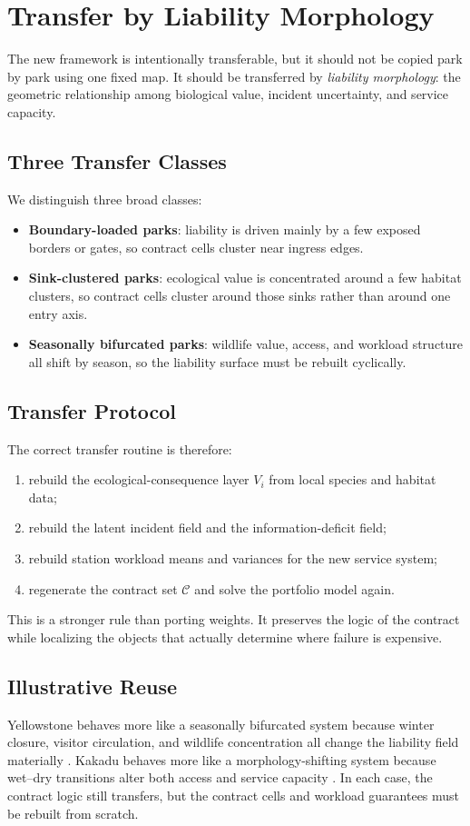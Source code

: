 \section{Transfer by Liability Morphology}
The new framework is intentionally transferable, but it should not be copied park by park using one fixed map. It should be transferred by \emph{liability morphology}: the geometric relationship among biological value, incident uncertainty, and service capacity.

\subsection{Three Transfer Classes}
We distinguish three broad classes:
\begin{itemize}
  \item \textbf{Boundary-loaded parks}: liability is driven mainly by a few exposed borders or gates, so contract cells cluster near ingress edges.
  \item \textbf{Sink-clustered parks}: ecological value is concentrated around a few habitat clusters, so contract cells cluster around those sinks rather than around one entry axis.
  \item \textbf{Seasonally bifurcated parks}: wildlife value, access, and workload structure all shift by season, so the liability surface must be rebuilt cyclically.
\end{itemize}

\subsection{Transfer Protocol}
The correct transfer routine is therefore:
\begin{enumerate}
  \item rebuild the ecological-consequence layer \(V_i\) from local species and habitat data;
  \item rebuild the latent incident field and the information-deficit field;
  \item rebuild station workload means and variances for the new service system;
  \item regenerate the contract set \(\mathcal{C}\) and solve the portfolio model again.
\end{enumerate}
This is a stronger rule than porting weights. It preserves the logic of the contract while localizing the objects that actually determine where failure is expensive.

\subsection{Illustrative Reuse}
Yellowstone behaves more like a seasonally bifurcated system because winter closure, visitor circulation, and wildlife concentration all change the liability field materially \citep{yellowstoneOfficial}. Kakadu behaves more like a morphology-shifting system because wet--dry transitions alter both access and service capacity \citep{kakaduOfficial}. In each case, the contract logic still transfers, but the contract cells and workload guarantees must be rebuilt from scratch.

